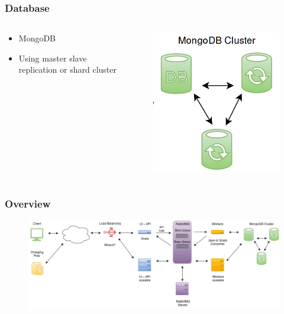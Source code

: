\documentclass[11pt]{beamer}
\begin{document}
\begin{frame}
\frametitle{Database}
\begin{columns}
    \begin{column}{.5\textwidth}
        \begin{itemize}
            \item MongoDB
            \item Using master slave replication or shard cluster
        \end{itemize}
    \end{column}
    \begin{column}{.5\textwidth}
        \begin{figure}
        \centering
        \includegraphics[width=\linewidth]{database.png}
        \end{figure}
    \end{column}
\end{columns}
\end{frame}

\begin{frame}
\frametitle{Overview}
\begin{figure}
\centering
\includegraphics[width=\linewidth]{architecture3.png}
\end{figure}
\end{frame}
\end{document}
